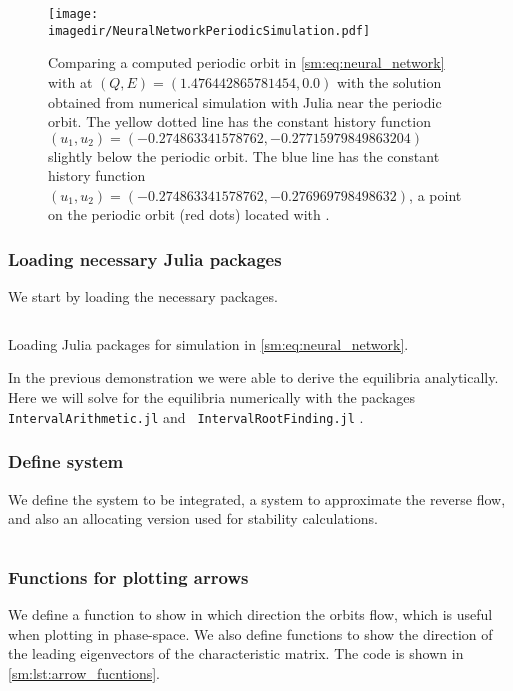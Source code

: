\begin{figure}[ht]
    \centering
    \texttt{[image: \\imagedir/NeuralNetworkPeriodicSimulation.pdf]}
    \caption{Comparing a computed periodic orbit in \cref{sm:eq:neural_network}
        with \DDEBIFTOOL at $(Q,E)=(1.476442865781454, 0.0)$ with the solution
        obtained from numerical simulation with Julia near the periodic orbit.
        The yellow dotted line has the constant history function $(u_1,u_2) =
        (-0.274863341578762, -0.27715979849863204)$ slightly below the periodic
        orbit.  The blue line has the constant history function $(u_1,u_2) =
        (-0.274863341578762, -0.276969798498632)$, a point on the periodic
        orbit (red dots) located with \DDEBIFTOOL.
    }
    \label{sm:fig:NeuralNetworkPeriodicSimulation}
\end{figure}

\subsubsection{Loading necessary Julia packages}
We start by loading the necessary packages.

%
\begin{listing}[h!!]
\inputminted[firstline=1, lastline=6]{julia}{\pathToJuliaFiles/neural_network_model_simulation_article.jl}
\caption{Loading Julia packages for simulation in \cref{sm:eq:neural_network}.}
\label{sm:lst:neuralNetworkLoadingPacakges}
\end{listing}

In the previous demonstration we were able to derive the equilibria
analytically.  Here we will solve for the equilibria numerically with the
packages {\tt IntervalArithmetic.jl} \cite{IntervalArithmetic} and  {\tt
IntervalRootFinding.jl} \cite{IntervalRootFinding}.

\subsubsection{Define system}
We define the system to be integrated, a system to approximate the reverse
flow, and also an allocating version used for stability calculations.
\inputminted[firstline=8, lastline=27]{julia}{\pathToJuliaFiles/neural_network_model_simulation_article.jl}

\subsubsection{Functions for plotting arrows}
We define a function to show in which direction the orbits flow, which is
useful when plotting in phase-space. We also define functions to show the
direction of the leading eigenvectors of the characteristic matrix.
The code is shown in \cref{sm:lst:arrow_fucntions}.

